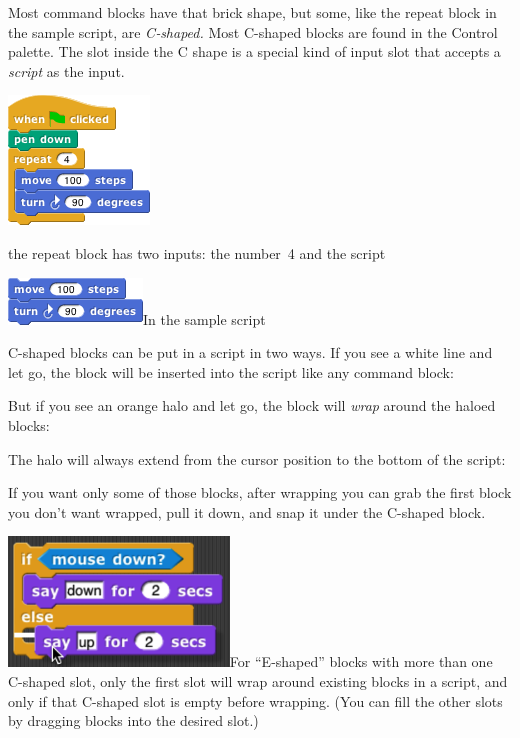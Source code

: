 Most command blocks have that brick shape, but some, like the repeat
block in the sample script, are \emph{C‑shaped.} Most C-shaped blocks
are found in the Control palette. The slot inside the C shape is a
special kind of input slot that accepts a \emph{script} as the input.

\includegraphics[width=1.47917in,height=1.35417in]{media/image6.png}

the repeat block has two inputs: the number~4 and the script

\includegraphics[width=1.40625in,height=0.48958in]{media/image11.png}In
the sample script

C-shaped blocks can be put in a script in two ways. If you see a white
line and let go, the block will be inserted into the script like any
command block:

But if you see an orange halo and let go, the block will \emph{wrap}
around the haloed blocks:

The halo will always extend from the cursor position to the bottom of
the script:

If you want only some of those blocks, after wrapping you can grab the
first block you don't want wrapped, pull it down, and snap it under the
C-shaped block.

\includegraphics[width=2.31111in,height=1.36667in]{media/image24.png}For
``E-shaped'' blocks with more than one C-shaped slot, only the first
slot will wrap around existing blocks in a script, and only if that
C-shaped slot is empty before wrapping. (You can fill the other slots by
dragging blocks into the desired slot.)

